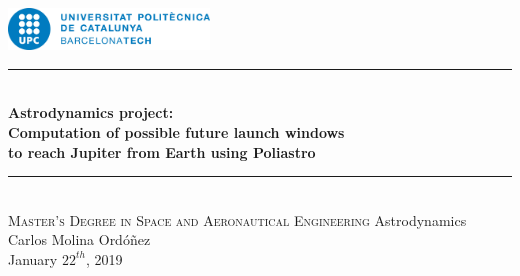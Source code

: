 
\begin{titlepage}

\newcommand{\HRule}{\rule{\linewidth}{0.5mm}} %

\center %

\includegraphics[width=0.4\textwidth]{img/UPC_logo.jpg}\\[5cm]


\HRule \\[0.2cm]
{ \Large \bfseries
Astrodynamics project:\\
Computation of possible future launch windows\\
to reach Jupiter from Earth using Poliastro
}
\HRule \\[1.5cm]


\textsc{\large Master's Degree in Space and Aeronautical Engineering}
\large Astrodynamics\\[0.8cm]

{ \normalsize Carlos Molina Ordóñez}\\

{\normalsize January $22^{th}$, 2019}\\[2cm] %



\vfill %

\end{titlepage}
